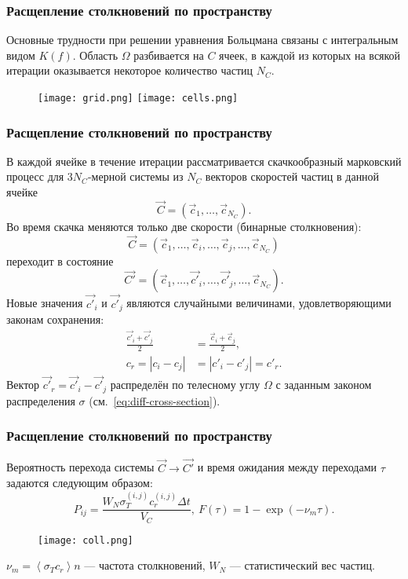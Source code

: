 \documentclass[onlymath]{beamer}
\newcommand{\abs}[1]{\left \lvert{#1}\right \rvert}
\newcommand\avg[1]{\left\langle{#1}\right\rangle}
\newcommand{\ts}{\Delta t}
\newcommand{\statw}{W_N}
\newcommand\dom{\Omega}
\newcommand{\cf}{\nu_m}
\newcommand{\dcs}{\sigma}
\newcommand{\ccs}{\sigma_T}
\begin{document}
\begin{frame}
  \frametitle{Расщепление столкновений по пространству}
  Основные трудности при решении уравнения Больцмана связаны с
  интегральным видом $K(f)$. Область $\dom$ разбивается на $C$ ячеек,
  в каждой из которых на всякой итерации оказывается некоторое
  количество частиц $N_C$.
  \begin{figure}[!h]
    \centering
    \texttt{[image: grid.png]}
    \texttt{[image: cells.png]}
  \end{figure}
\end{frame}

\begin{frame}
  \frametitle{Расщепление столкновений по пространству}
  В каждой ячейке в течение итерации рассматривается скачкообразный
  марковский процесс для $3N_C$-мерной системы из $N_C$ векторов
  скоростей частиц в данной ячейке
  \begin{equation*}
    \vec{C} = (\vec{c}_1, \dotsc, \vec{c}_{N_C}).
  \end{equation*}
  Во время скачка меняются только две скорости (бинарные
  столкновения):
  \begin{equation*}
    \vec{C} = (\vec{c}_1,\dotsc,\vec{c}_i,\dotsc,\vec{c}_j,\dotsc,\vec{c}_{N_C})
  \end{equation*}
  переходит в состояние 
  \begin{equation*}
    \vec{C'} = (\vec{c}_1,\dotsc,\vec{c'}_i,\dotsc,\vec{c'}_j,\dotsc,\vec{c}_{N_C}).
  \end{equation*}
  Новые значения $\vec{c'}_i$ и $\vec{c'}_j$ являются случайными
  величинами, удовлетворяющими законам сохранения:
  \begin{equation*}
    \begin{aligned}
      \frac{\vec{c'}_i+\vec{c'}_j}{2} &=
      \frac{\vec{c}_i+\vec{c}_j}{2},\\
      c_r = \abs{c_i - c_j} &= \abs{c'_i - c'_j} = c'_r.
    \end{aligned}
  \end{equation*}
 Вектор $\vec{c'}_r = \vec{c'}_i - \vec{c'}_j$ распределён по
  телесному углу $\Omega$ с заданным законом распределения $\dcs$
  (см. \eqref{eq:diff-cross-section}).
\end{frame}

\begin{frame}
  \frametitle{Расщепление столкновений по пространству}
  Вероятность перехода системы $\vec{C} \to \vec{C'}$ и время ожидания
  между переходами $\tau$ задаются следующим образом:
  \begin{equation*}
    \label{eq:coll-prob-generic}
    P_{ij} = \frac{\statw\ccs^{(i,j)}c_r^{(i, j)} \ts}{V_C},\:    F(\tau) = 1 - \exp(-\cf \tau).
  \end{equation*}
  \begin{figure}[!h]
    \centering
    \texttt{[image: coll.png]}
  \end{figure}
  $\cf = \avg{\ccs c_r} n$ — частота столкновений, $\statw$ —
  статистический вес частиц.
\end{frame}
\end{document}
